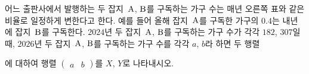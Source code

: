 \noindent\begin{minipage}[t]{0.58\linewidth}\vspace{0pt}\raggedright 어느 출판사에서 발행하는 두 잡지~$\mathrm{A}$, $\mathrm{B}$를 구독하는 가구 수는 매년 오른쪽 표와 같은 비율로 일정하게 변한다고 한다. 예를 들어 올해 잡지~$\mathrm{A}$를 구독한 가구의 $0.4$는 내년에 잡지~$\mathrm{B}$를 구독한다. $2024$년 두 잡지~$\mathrm{A}$, $\mathrm{B}$를 구독하는 가구 수가 각각 $182$, $307$일 때, $2026$년 두 잡지~$\mathrm{A}$, $\mathrm{B}$를 구독하는 가구 수를 각각 $a$, $b$라 하면 두 행렬\par\smallskip\end{minipage}\hfill\begin{minipage}[t]{0.4\linewidth}\vspace{0pt}\centering \resizebox{\ifdim\width>\linewidth\linewidth\else\width\fi}{!}{}\end{minipage}\par
\noindent {}\par\smallskip\noindent 에 대하여 행렬 $\begin{pmatrix} a & b \end{pmatrix}$를 $X$, $Y$로 나타내시오.
